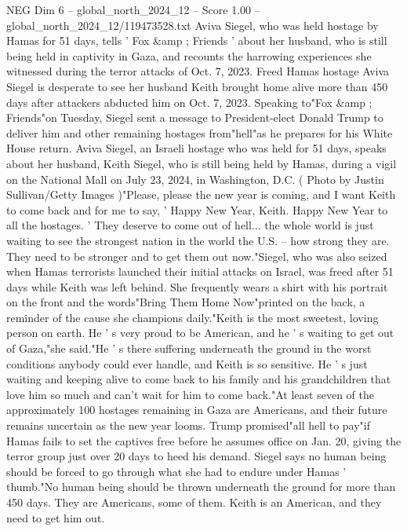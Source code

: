 \begin{textsample}{NEG Dim 6 – global\_north\_2024\_12 – Score 1.00 – global\_north\_2024\_12/119473528.txt}  \label{ex:f6_neg_181}
Aviva Siegel, who was held hostage by Hamas for 51 days, tells ' Fox \&amp ; Friends ' about her husband, who is still being held in captivity in Gaza, and recounts the harrowing experiences she witnessed during the terror attacks of Oct. 7, 2023.
Freed Hamas hostage Aviva Siegel is desperate to see her husband Keith brought home alive more than 450 days after attackers abducted him on Oct. 7, 2023.
Speaking to"Fox \&amp ; Friends"on Tuesday, Siegel sent a message to President-elect Donald Trump to deliver him and other remaining hostages from"hell"as he prepares for his White House return.
Aviva Siegel, an Israeli hostage who was held for 51 days, speaks about her husband, Keith Siegel, who is still being held by Hamas, during a vigil on the National Mall on July 23, 2024, in Washington, D.C. ( Photo by Justin Sullivan/Getty Images )"Please, please the new year is coming, and I want Keith to come back and for me to say, ' Happy New Year, Keith.
Happy New Year to all the hostages. ' They deserve to come out of hell... the whole world is just waiting to see the strongest nation in the world the U.S. -- how strong they are.
They need to be stronger and to get them out now."Siegel, who was also seized when Hamas terrorists launched their initial attacks on Israel, was freed after 51 days while Keith was left behind.
She frequently wears a shirt with his portrait on the front and the words"Bring Them Home Now"printed on the back, a reminder of the cause she champions daily."Keith is the most sweetest, loving person on earth.
He ' s very proud to be American, and he ' s waiting to get out of Gaza,"she said."He ' s there suffering underneath the ground in the worst conditions anybody could ever handle, and Keith is so sensitive.
He ' s just waiting and keeping alive to come back to his family and his grandchildren that love him so much and can't wait for him to come back."At least seven of the approximately 100 hostages remaining in Gaza are Americans, and their future remains uncertain as the new year looms.
Trump promised"all hell to pay"if Hamas fails to set the captives free before he assumes office on Jan. 20, giving the terror group just over 20 days to heed his demand.
Siegel says no human being should be forced to go through what she had to endure under Hamas ' thumb."No human being should be thrown underneath the ground for more than 450 days.
They are Americans, some of them.
Keith is an American, and they need to get him out.

\end{textsample}
